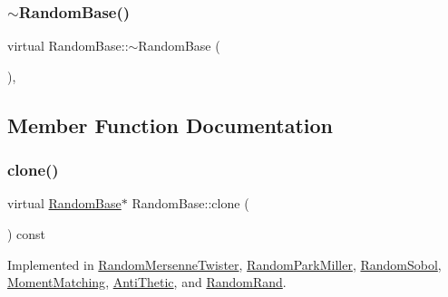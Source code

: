 \hypertarget{classRandomBase_a3a28f8ddea158351677b4d82657cf5ee}{}\label{classRandomBase_a3a28f8ddea158351677b4d82657cf5ee} 
\subsubsection{\texorpdfstring{$\sim$\+Random\+Base()}{~RandomBase()}}
{\footnotesize\ttfamily virtual Random\+Base\+::$\sim$\+Random\+Base (\begin{DoxyParamCaption}{ }\end{DoxyParamCaption})\hspace{0.3cm}{\ttfamily [inline]}, {\ttfamily [virtual]}}



\subsection{Member Function Documentation}
\hypertarget{classRandomBase_a0906f4590283535ec40427ad31ba7850}{}\label{classRandomBase_a0906f4590283535ec40427ad31ba7850} 
\subsubsection{\texorpdfstring{clone()}{clone()}}
{\footnotesize\ttfamily virtual \hyperlink{classRandomBase}{Random\+Base}$\ast$ Random\+Base\+::clone (\begin{DoxyParamCaption}{ }\end{DoxyParamCaption}) const\hspace{0.3cm}{\ttfamily [pure virtual]}}



Implemented in \hyperlink{classRandomMersenneTwister_a0faf486ea7b17d013b3165ac9fc8171d}{Random\+Mersenne\+Twister}, \hyperlink{classRandomParkMiller_abeadf7c9bd2549c604b56b4fbf05278d}{Random\+Park\+Miller}, \hyperlink{classRandomSobol_ac0c06a34aa22ed8caa009d42d3212365}{Random\+Sobol}, \hyperlink{classMomentMatching_a21274179f7a0cb3207b690e2e3da6c3a}{Moment\+Matching}, \hyperlink{classAntiThetic_ab736855d3978fdc1ff914239cfc51a9d}{Anti\+Thetic}, and \hyperlink{classRandomRand_a7499fbf182a11829cac3068bc66ffe22}{Random\+Rand}.

\hypertarget{classRandomBase_aa3f3efa1333ab5d7689b8cc7ebd26622}{}\label{classRandomBase_aa3f3efa1333ab5d7689b8cc7ebd26622} 
